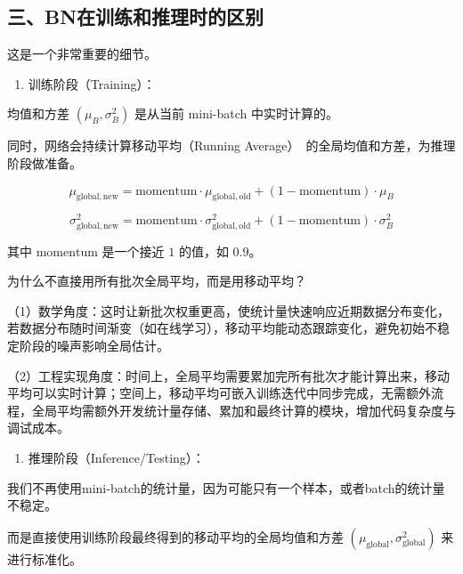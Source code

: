 \hypertarget{ux4e09bnux5728ux8badux7ec3ux548cux63a8ux7406ux65f6ux7684ux533aux522b}{%
\subsection{三、BN在训练和推理时的区别}\label{ux4e09bnux5728ux8badux7ec3ux548cux63a8ux7406ux65f6ux7684ux533aux522b}}

这是一个非常重要的细节。

\begin{enumerate}
\def\labelenumi{\arabic{enumi}.}
\tightlist
\item
{}
  训练阶段（Training）：
\end{enumerate}

均值和方差 \((\mu_B,\sigma_B^2)\) 是从当前 mini-batch 中实时计算的。

同时，网络会持续计算移动平均（Running Average）~的全局均值和方差，为推理阶段做准备。

\[
\mu_{\mathrm{global,new}}
= \mathrm{momentum}\cdot\mu_{\mathrm{global,old}}
+ (1-\mathrm{momentum})\cdot\mu_B
\]

\[
\sigma_{\mathrm{global,new}}^2
= \mathrm{momentum}\cdot\sigma_{\mathrm{global,old}}^2
+ (1-\mathrm{momentum})\cdot\sigma_B^2
\]

其中 \(\mathrm{momentum}\) 是一个接近 \(1\) 的值，如 \(0.9\)。

为什么不直接用所有批次全局平均，而是用移动平均？

（1）数学角度：这时让新批次权重更高，使统计量快速响应近期数据分布变化，若数据分布随时间渐变（如在线学习），移动平均能动态跟踪变化，避免初始不稳定阶段的噪声影响全局估计。

（2）工程实现角度：时间上，全局平均需要累加完所有批次才能计算出来，移动平均可以实时计算；空间上，移动平均可嵌入训练迭代中同步完成，无需额外流程，全局平均需额外开发统计量存储、累加和最终计算的模块，增加代码复杂度与调试成本。

\begin{enumerate}
\def\labelenumi{\arabic{enumi}.}
\setcounter{enumi}{1}
\tightlist
\item
{}
  推理阶段（Inference/Testing）：
\end{enumerate}

我们不再使用mini-batch的统计量，因为可能只有一个样本，或者batch的统计量不稳定。

而是直接使用训练阶段最终得到的移动平均的全局均值和方差 \((\mu_{\text{global}},\sigma_{\text{global}}^2)\) 来进行标准化。

